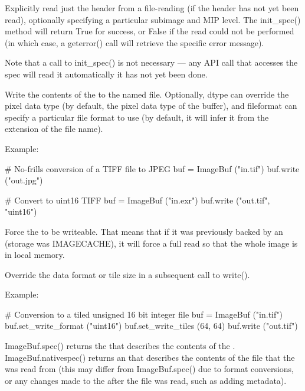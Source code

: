 
Explicitly read just the header from a file-reading \ImageBuf (if the header
has not yet been read), optionally specifying a particular subimage and MIP
level. The {\cf init_spec()} method will return {\cf True} for success, or
{\cf False} if the read could not be performed (in which case, a {\cf
geterror()} call will retrieve the specific error message).

Note that a call to {\cf init_spec()} is not necessary --- any \ImageBuf API
call that accesses the spec will read it automatically it has not yet been
done.
\apiend

Write the contents of the \ImageBuf to the named file.  Optionally,
{\cf dtype} can override the pixel data type (by default, the pixel data
type of the buffer), and {\cf fileformat} can specify a particular file
format to use (by default, it will infer it from the extension of the file
name).

\noindent Example:
\begin{code}
    # No-frills conversion of a TIFF file to JPEG
    buf = ImageBuf ("in.tif")
    buf.write ("out.jpg")

    # Convert to uint16 TIFF
    buf = ImageBuf ("in.exr")
    buf.write ("out.tif", "uint16")
\end{code}
\apiend

Force the \ImageBuf to be writeable. That means that if it was previously
backed by an \ImageCache (storage was {\cf IMAGECACHE}), it will force a
full read so that the whole image is in local memory.
\apiend


Override the data format or tile size in a subsequent call to {\cf write()}.

\noindent Example:
\begin{code}
    # Conversion to a tiled unsigned 16 bit integer file
    buf = ImageBuf ("in.tif")
    buf.set_write_format ("uint16")
    buf.set_write_tiles (64, 64)
    buf.write ("out.tif")
\end{code}
\apiend

{\cf ImageBuf.spec()} returns the \ImageSpec that describes the contents of
the \ImageBuf.  {\cf ImageBuf.nativespec()} returns an \ImageSpec that
describes the contents of the file that the \ImageBuf was read from (this
may differ from {\cf ImageBuf.spec()} due to format conversions, or any
changes made to the \ImageBuf after the file was read, such as adding
metadata).

